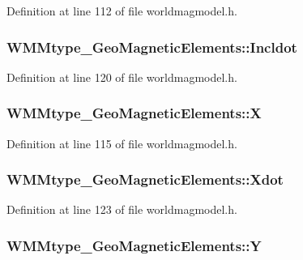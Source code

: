 Definition at line 112 of file worldmagmodel.\-h.

\hypertarget{struct_w_m_mtype___geo_magnetic_elements_ad42b26463a764fbbe5fa6fe815d81f00}{
\subsubsection[{Incldot}]{ W\-M\-Mtype\-\_\-\-Geo\-Magnetic\-Elements\-::\-Incldot}}\label{struct_w_m_mtype___geo_magnetic_elements_ad42b26463a764fbbe5fa6fe815d81f00}


Definition at line 120 of file worldmagmodel.\-h.

\hypertarget{struct_w_m_mtype___geo_magnetic_elements_aa8c06cae11ef4891bf6d43eaeb7787d5}{
\subsubsection[{X}]{ W\-M\-Mtype\-\_\-\-Geo\-Magnetic\-Elements\-::\-X}}\label{struct_w_m_mtype___geo_magnetic_elements_aa8c06cae11ef4891bf6d43eaeb7787d5}


Definition at line 115 of file worldmagmodel.\-h.

\hypertarget{struct_w_m_mtype___geo_magnetic_elements_a98363bfa933b65aae742479e14dc209a}{
\subsubsection[{Xdot}]{ W\-M\-Mtype\-\_\-\-Geo\-Magnetic\-Elements\-::\-Xdot}}\label{struct_w_m_mtype___geo_magnetic_elements_a98363bfa933b65aae742479e14dc209a}


Definition at line 123 of file worldmagmodel.\-h.

\hypertarget{struct_w_m_mtype___geo_magnetic_elements_a0b311ece921afc948e5e8dda01f7584a}{
\subsubsection[{Y}]{ W\-M\-Mtype\-\_\-\-Geo\-Magnetic\-Elements\-::\-Y}}\label{struct_w_m_mtype___geo_magnetic_elements_a0b311ece921afc948e5e8dda01f7584a}


